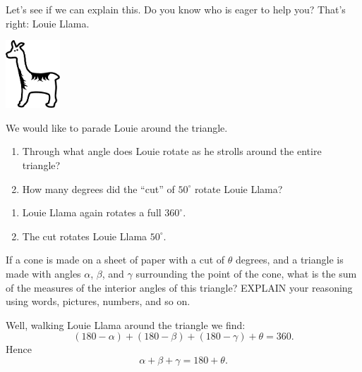 \documentclass[nooutcomes,noauthor,handout]{ximera}
\begin{document}
\begin{question}
  Let's see if we can explain this. Do you know who is eager to help
you? That's right: Louie Llama.
\begin{center}
\includegraphics[height=1in]{llama.pdf}
\end{center}

We would like to parade Louie around the triangle.
\begin{enumerate}
\item Through what angle does Louie rotate as he strolls around the
  entire triangle?
\item How many degrees did the ``cut'' of $50^\circ$ rotate Louie
  Llama?
\end{enumerate}
\begin{freeResponse}
  \begin{enumerate}
  \item Louie Llama again rotates a full $360^\circ$.
  \item The cut rotates Louie Llama $50^\circ$.
  \end{enumerate}
\end{freeResponse}
\end{question}

\mynewpage


\begin{question}
If a cone is made on a sheet of paper with a cut of $\theta$ degrees,
and a triangle is made with angles $\alpha$, $\beta$, and $\gamma$
surrounding the point of the cone, what is the sum of the measures of
the interior angles of this triangle? EXPLAIN your reasoning using words, pictures, numbers, and so on.
\begin{freeResponse}
  Well, walking Louie Llama around the triangle we find:
  \[
  (180-\alpha) + (180-\beta) + (180-\gamma) + \theta = 360.
  \]
  Hence
  \[
  \alpha + \beta + \gamma = 180 + \theta.
  \]
\end{freeResponse}
\end{question}
\end{document}
